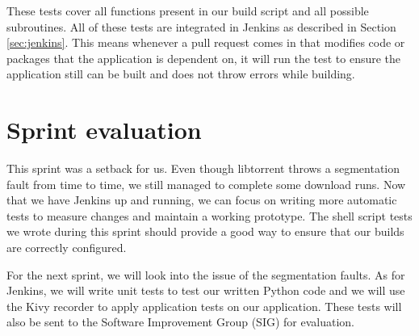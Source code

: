 		These tests cover all functions present in our build script and all possible subroutines. All of these tests are integrated in Jenkins as described in Section \ref{sec:jenkins}. This means whenever a pull request comes in that modifies code or packages that the application is dependent on, it will run the test to ensure the application still can be built and does not throw errors while building.

	\section{Sprint evaluation}
		This sprint was a setback for us. Even though libtorrent throws a segmentation fault from time to time, we still managed to complete some download runs. Now that we have Jenkins up and running, we can focus on writing more automatic tests to measure changes and maintain a working prototype. The shell script tests we wrote during this sprint should provide a good way to ensure that our builds are correctly configured.
		
		For the next sprint, we will look into the issue of the segmentation faults. As for Jenkins, we will write unit tests to test our written Python code and we will use the Kivy recorder to apply application tests on our application. These tests will also be sent to the Software Improvement Group (SIG) for evaluation.
